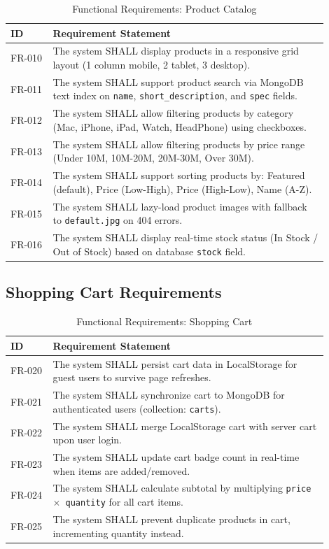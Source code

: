 \documentclass[12pt, a4paper]{report}
\begin{document}
\begin{table}[H]
\centering
\caption{Functional Requirements: Product Catalog}
\label{tab:fr_products}
\small
\begin{tabular}{@{}p{0.12\linewidth}p{0.78\linewidth}@{}}
\toprule
\textbf{ID} & \textbf{Requirement Statement} \\
\midrule
FR-010 & The system SHALL display products in a responsive grid layout (1 column mobile, 2 tablet, 3 desktop). \\
FR-011 & The system SHALL support product search via MongoDB text index on \texttt{name}, \texttt{short\_description}, and \texttt{spec} fields. \\
FR-012 & The system SHALL allow filtering products by category (Mac, iPhone, iPad, Watch, HeadPhone) using checkboxes. \\
FR-013 & The system SHALL allow filtering products by price range (Under 10M, 10M-20M, 20M-30M, Over 30M). \\
FR-014 & The system SHALL support sorting products by: Featured (default), Price (Low-High), Price (High-Low), Name (A-Z). \\
FR-015 & The system SHALL lazy-load product images with fallback to \texttt{default.jpg} on 404 errors. \\
FR-016 & The system SHALL display real-time stock status (In Stock / Out of Stock) based on database \texttt{stock} field. \\
\bottomrule
\end{tabular}
\end{table}

\subsection{Shopping Cart Requirements}

\begin{table}[H]
\centering
\caption{Functional Requirements: Shopping Cart}
\label{tab:fr_cart}
\small
\begin{tabular}{@{}p{0.12\linewidth}p{0.78\linewidth}@{}}
\toprule
\textbf{ID} & \textbf{Requirement Statement} \\
\midrule
FR-020 & The system SHALL persist cart data in LocalStorage for guest users to survive page refreshes. \\
FR-021 & The system SHALL synchronize cart to MongoDB for authenticated users (collection: \texttt{carts}). \\
FR-022 & The system SHALL merge LocalStorage cart with server cart upon user login. \\
FR-023 & The system SHALL update cart badge count in real-time when items are added/removed. \\
FR-024 & The system SHALL calculate subtotal by multiplying \texttt{price $\times$ quantity} for all cart items. \\
FR-025 & The system SHALL prevent duplicate products in cart, incrementing quantity instead. \\
\bottomrule
\end{tabular}
\end{table}
\end{document}
